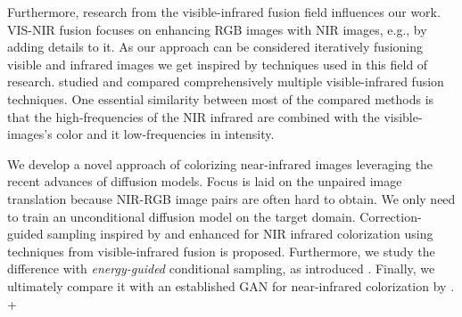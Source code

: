 Furthermore, research from the visible-infrared fusion field influences our work.
VIS-NIR fusion focuses on enhancing RGB images with NIR images, e.g., by adding details to it. 
As our approach can be considered iteratively fusioning visible and infrared images we get inspired by techniques used in this field of research.  
\textcite{study-vis-nir-fusion} studied and compared comprehensively multiple visible-infrared fusion techniques. 
One essential similarity between most of the compared methods is that the high-frequencies of the NIR infrared are combined with the visible-images's color and it low-frequencies in intensity.

We develop a novel approach of colorizing near-infrared images leveraging the recent advances of diffusion models. 
Focus is laid on the unpaired image translation because NIR-RGB image pairs are often hard to obtain. 
We only need to train an unconditional diffusion model on the target domain. 
Correction-guided sampling inspired by \textcite{ilvr} and enhanced for NIR infrared colorization using techniques from visible-infrared fusion \parencite{study-vis-nir-fusion} is proposed. 
Furthermore, we study the difference with \textit{energy-guided} conditional sampling, as introduced \textcite{egsde}. 
Finally, we ultimately compare it with an established GAN for near-infrared colorization by \textcite{mehri}. +


